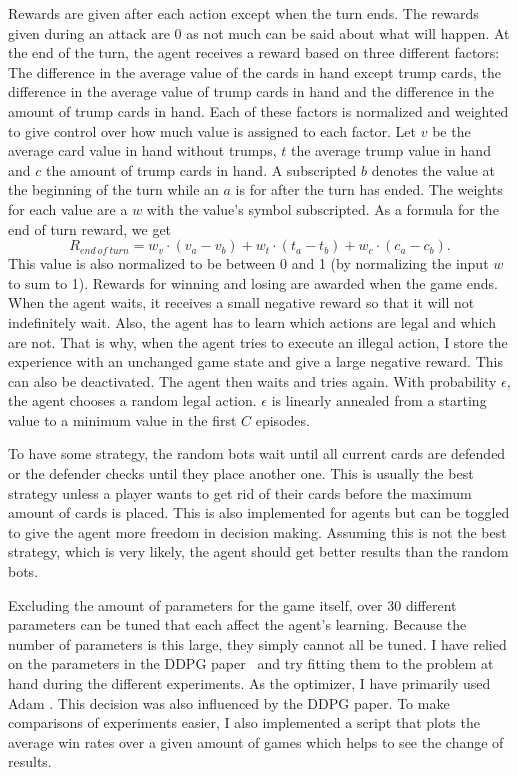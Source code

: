 \documentclass[a4paper,titlepage]{article}
\begin{document}
Rewards are given after each action except when the turn ends. The rewards given during an attack are 0 as not much can be said about what will happen. At the end of the turn, the agent receives a reward based on three different factors: The difference in the average value of the cards in hand except trump cards, the difference in the average value of trump cards in hand and the difference in the amount of trump cards in hand. Each of these factors is normalized and weighted to give control over how much value is assigned to each factor.
Let $v$ be the average card value in hand without trumps, $t$ the average trump value in hand and $c$ the amount of trump cards in hand. A subscripted $b$ denotes the value at the beginning of the turn while an $a$ is for after the turn has ended. The weights for each value are a $w$ with the value's symbol subscripted. As a formula for the end of turn reward, we get
\begin{equation*}
  R_{end\ of\ turn} = w_v \cdot (v_a - v_b) + w_t \cdot (t_a - t_b) + w_c \cdot (c_a - c_b).
\end{equation*}
This value is also normalized to be between 0 and 1 (by normalizing the input $w$ to sum to 1). Rewards for winning and losing are awarded when the game ends. When the agent waits, it receives a small negative reward so that it will not indefinitely wait. Also, the agent has to learn which actions are legal and which are not. That is why, when the agent tries to execute an illegal action, I store the experience with an unchanged game state and give a large negative reward. This can also be deactivated. The agent then waits and tries again. With probability $\epsilon$, the agent chooses a random legal action. $\epsilon$ is linearly annealed from a starting value to a minimum value in the first $C$ episodes.

To have some strategy, the random bots wait until all current cards are defended or the defender checks until they place another one. This is usually the best strategy unless a player wants to get rid of their cards before the maximum amount of cards is placed. This is also implemented for agents but can be toggled to give the agent more freedom in decision making. Assuming this is not the best strategy, which is very likely, the agent should get better results than the random bots.

Excluding the amount of parameters for the game itself, over 30 different parameters can be tuned that each affect the agent's learning.
Because the number of parameters is this large, they simply cannot all be tuned. I have relied on the parameters in the DDPG paper~\cite[p.~11]{ddpg} and try fitting them to the problem at hand during the different experiments.
As the optimizer, I have primarily used Adam \cite{adam}. This decision was also influenced by the DDPG paper.
To make comparisons of experiments easier, I also implemented a script that plots the average win rates over a given amount of games which helps to see the change of results. \medskip
\end{document}
